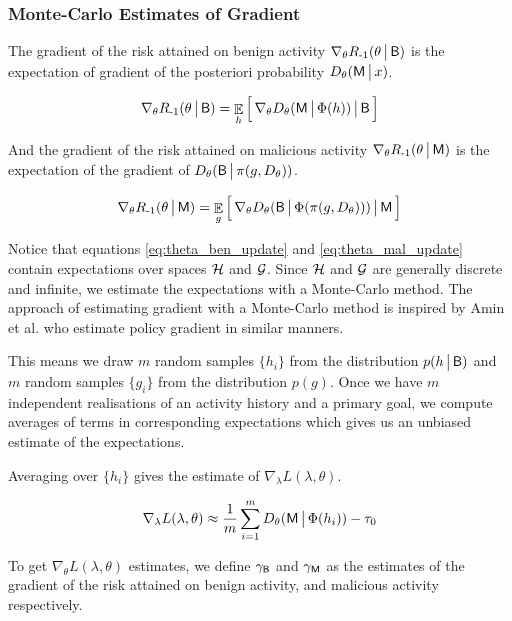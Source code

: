 \subsubsection{Monte-Carlo Estimates of Gradient}\label{sec:monte-carlo}
The gradient of the risk attained on benign activity $\nabla_\theta R_{{\text{-}1}}(\theta \,\big|\, \mathsf{B})$ is the expectation of gradient of the posteriori probability $D_\theta(\mathsf{M} \,\big|\, x)$.

\begin{equation}\label{eq:theta_ben_update}
    \nabla_\theta R_{{\text{-}1}}(\theta \,\big|\, \mathsf{B}) = \mathop{\mathbb{E}}_{h} \Big[\, \nabla_\theta D_\theta(\mathsf{M} \,\big|\, \Phi (h)) \,\big|\, \mathsf{B} \,\Big]
\end{equation}

And the gradient of the risk attained on malicious activity $\nabla_\theta R_{{\text{-}1}}(\theta \,\big|\, \mathsf{M})$ is the expectation of the gradient of $D_\theta(\mathsf{B} \,\big|\, \pi(g, D_\theta))$.

\begin{equation}\label{eq:theta_mal_update}
    \nabla_\theta R_{{\text{-}1}}(\theta \,\big|\, \mathsf{M}) = \mathop{\mathbb{E}}_{g} \Big[\, \nabla_\theta D_\theta(\mathsf{B} \,\big|\, \Phi ( \pi(g, D_\theta) ) ) \,\big|\, \mathsf{M} \,\Big]
\end{equation}

Notice that equations \eqref{eq:theta_ben_update} and \eqref{eq:theta_mal_update} contain expectations over spaces $\mathcal{H}$ and $\mathcal{G}$. Since $\mathcal{H}$ and $\mathcal{G}$ are generally discrete and infinite, we estimate the expectations with a Monte-Carlo method. The approach of estimating gradient with a Monte-Carlo method is inspired by Amin et al. \cite{stackgrad} who estimate policy gradient in similar manners.

This means we draw $m$ random samples $\{ h_i \}$ from the distribution $p(h \,\big|\, \mathsf{B})$ and  $m$ random samples $\{ g_i \}$ from the distribution $p(g)$.
Once we have $m$ independent realisations of an activity history and a primary goal, we compute averages of terms in corresponding expectations which gives us an unbiased estimate of the expectations.

Averaging over $\{ h_i \}$ gives the estimate of $\nabla_\lambda L(\lambda, \theta)$.

\begin{equation}
    \nabla_\lambda L(\lambda, \theta) \approx \frac{1}{m} \sum^{m}_{i=1} D_\theta(\mathsf{M} \,\big|\, \Phi (h_i)) - \tau_0
\end{equation}

To get $\nabla_\theta L(\lambda, \theta)$ estimates, we define $\gamma_{\mathsf{B}}$ and $\gamma_{\mathsf{M}}$ as the estimates of the gradient of the risk attained on benign activity, and malicious activity respectively.

